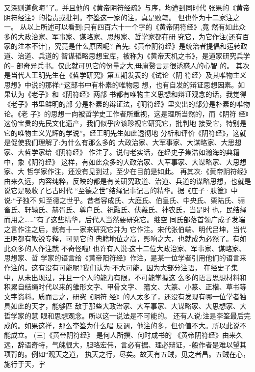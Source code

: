\documentclass[12pt,UTF8]{ctexbook}
\begin{document}
又深则道愈晦”了。并且他的《黄帝阴符经疏》与序，均遭到同时代
张果的《黄帝阴符经注》的指责或批判。李筌这一家的注，真是败笔。
但也作为十二家注之一。
从以上所述可以看到:只有四百六十一个字的《黄帝阴符经》,竟
然有如此众多的大政治家、军事家、谋略家、思想家、哲学家都在研
究它，为它作注(还有百家的注本不计)，究竟是什么原因呢?
首先:《黄帝阴符经》是统治者提倡和运转政道、治道、兵道的
智谋韬略思想宝库，被称为《黄帝天机之书》，是道家研究兵学的--
部奇异兵书。仅此就可见它的份量之大,毋庸赘言是很诱惑人的心智
的。
其次是当代人王明先生在《哲学研究》第五期发表的《试论〈阴
符经〉及其唯物主义思想》中说的那祥:“这部书中有朴素的唯物思
想，也有自发的辩证思想因素。如果认为《老子》和《阴符经》两部
书都有唯物主义思想和辩证观念的话，我觉得《老子》书里鲜明的部
分是朴素的辩证法，《阴符经》里突出的部分是朴素的唯物论。《老
子》的思想一向被哲学史工作者所重视，这是理所当然的，而《阴符
经》这份宝贵的先民文化遗产，我们似乎应该珍视它研究它，批判地
接受它，特别是它的唯物主义光辉的学说”。经王明先生如此透彻地
分析和评价《阴符经》，这就是促使我们理解了:为什么有那么多的
大政治家、大军事家、大谋略家、大思想家、大哲学家给《阴符经》
作注了。说句老实话，在经史子集浩如瀚海的典籍中，象《阴符经》
这样，有如此众多的大政治家、大军事家、大谋略家、大思想家、大
哲学家作注，还没有见到过，至少在目前是如此。
再其次:《黄帝阴符经》由来久远，内容纯粹，反映的都是有关研究政道、治道、兵道的谋略思想，也就是说它是吸收了匕古时代
“至德之世”结绳记事记言的精华。据《庄子·肤箧》中说:“子独不
知至德之世乎。昔者容成氏、大庭氏、伯皇氏、中央氏、栗陆氏、骊
畜氏、轩辕氏、赫胥氏、尊户氏、祝融氏、伏羲氏、神农氏，当是时
也，民结绳而用之……”有了这些精华，后代人当然要研究它。继空
同氏部落首领广成子发端之言作注之后，就有十一家来研究它并为
它作注。宋代张伯端、明代吕坤，当代王明都有敏锐专释，可见它的
典籍地位之高，影响之大，也就成为必然了。有如此众多的人作注就
不奇怪啦!
也许有人说:这十二位大政治家、军事家、谋略家、思想家、哲
学家的语言给《黄帝阳符经》作注，是某一位学者引用他们的语言来
作注的。这有没有可能呢?我们认为:不大可能。因为大部分注语，
在经史子集中，从未出现过，并且一个人的能力有限，不可能掌握这
么多的语言思想材料和积累自结绳时代以来的雏形文字、甲骨文字、
籀文、大篆、小篆、正楷、草书等文字资料。质而言之，研究《阴符
经》的人太多了，还没有发现有哪一位学者独具如此的天才，能够匹
敌于那些大政治家、大军事家、大谋略家、大思想家、大哲学家的慧
眼和思想观念。所以这一说法是不可能的。
还有人说:注是李筌最后完成的。如果这祥，那么李筌为什么唱
反调，他注的多，但价值不大。所以此说不能成立。
(三)《黄帝阴符经》
是何人所撰、何时成书的
《黄帝阴符经》由来久远，辞语奇特，气魄很大，胆略宏伟，言必有据、理必辩证，-般作者是难以望其项背的。例如“观天之道，
执天之行，尽矣。故天有五贼，见之者昌。五贼在心，施行于天，宇
\end{document}
